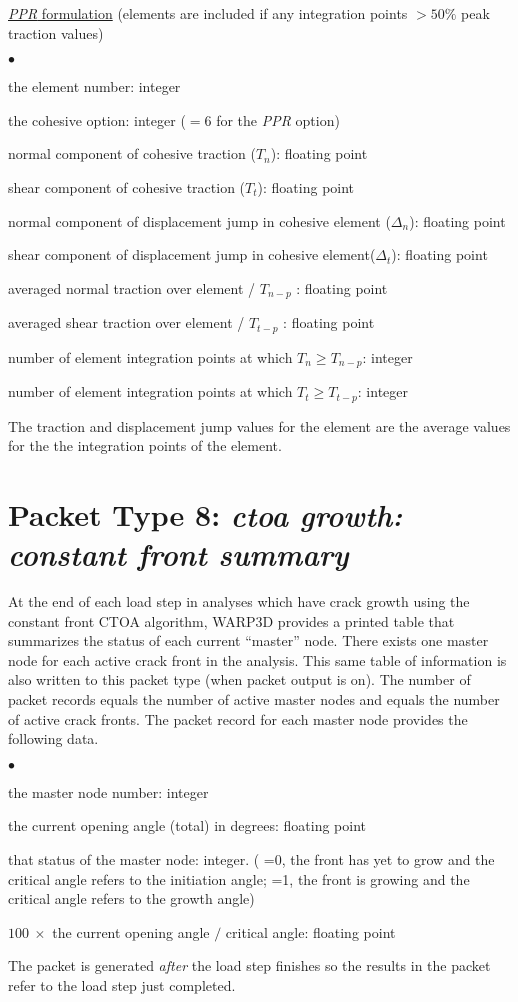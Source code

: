 \documentclass[10pt]{report}
\numberwithin{equation}{section}
\newcommand{\ul} {\underline}
\newcommand{\ti}{\emph}
\newcommand{\squishlist}{
 \begin{list}{$\bullet$}
  { \setlength{\itemsep}{0pt}
     \setlength{\parsep}{3pt}
     \setlength{\topsep}{3pt}
     \setlength{\partopsep}{0pt}
     \setlength{\leftmargin}{1.5em}
     \setlength{\labelwidth}{1em}
     \setlength{\labelsep}{0.5em} } }
\newcommand{\squishend}{
  \end{list}  }
\begin{document}
\noindent \ul{\ti{PPR} formulation} (elements are included if any 
integration points $> 50\%$ peak traction values)
\squishlist
\item the element number:  integer
\item the cohesive option:  integer ($=6$ for the \ti{PPR} option)
\item normal component of cohesive traction ($T_n$):  floating point
\item shear component of cohesive traction ($T_t$):  floating point
\item normal component of displacement jump in cohesive element ($\Delta_n$):  floating point
\item shear component of displacement jump in cohesive element($\Delta_t$):  floating point
\item averaged normal traction over element / $T_{n-p}$ :  floating point
\item averaged shear traction over element  / $T_{t-p}$ :  floating point
\item number of element integration points at which $T_n \ge T_{n-p}$: integer
\item number of element integration points at which $T_t \ge T_{t-p}$: integer
\squishend
\noindent The traction and displacement jump values for the element are the 
average values for the the integration points of the element. 

%
%
\section{Packet Type 8: \ti{ctoa growth: constant front summary}}
At the end of each load step in analyses which have crack growth 
using the constant front CTOA algorithm, WARP3D provides a printed table that 
summarizes the status of each current ``master'' node. There exists one master 
node for each active crack front in the analysis. This same table of information is 
also written to this packet type (when packet output is on). The number of packet 
records equals the number of active master nodes and equals the number of 
active crack fronts. The packet record for each master node provides the following data.
\squishlist
\item the master node number:  integer
\item the current opening angle (total) in degrees:  floating point
\item that status of the master node:  integer. ( =0, the front has yet to grow and the 
critical angle refers to the initiation angle;  =1, the front is growing and the critical angle 
refers to the growth angle)
\item $100\ \times$ the current opening angle $/$  critical angle:  floating point
\squishend
\noindent The packet is generated \ti{after} the load step finishes 
so the results in the packet refer to the load step just completed.
\end{document}
